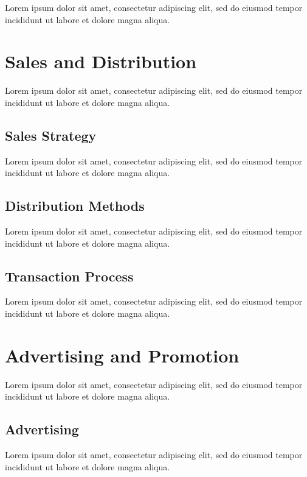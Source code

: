 Lorem ipsum dolor sit amet, consectetur adipiscing elit, sed do eiusmod tempor incididunt ut labore et dolore magna aliqua.


\section{Sales and Distribution}

Lorem ipsum dolor sit amet, consectetur adipiscing elit, sed do eiusmod tempor incididunt ut labore et dolore magna aliqua.

\subsection{Sales Strategy}

Lorem ipsum dolor sit amet, consectetur adipiscing elit, sed do eiusmod tempor incididunt ut labore et dolore magna aliqua.

\subsection{Distribution Methods}

Lorem ipsum dolor sit amet, consectetur adipiscing elit, sed do eiusmod tempor incididunt ut labore et dolore magna aliqua.

\subsection{Transaction Process}

Lorem ipsum dolor sit amet, consectetur adipiscing elit, sed do eiusmod tempor incididunt ut labore et dolore magna aliqua.


\section{Advertising and Promotion}

Lorem ipsum dolor sit amet, consectetur adipiscing elit, sed do eiusmod tempor incididunt ut labore et dolore magna aliqua.

\subsection{Advertising}

Lorem ipsum dolor sit amet, consectetur adipiscing elit, sed do eiusmod tempor incididunt ut labore et dolore magna aliqua.

